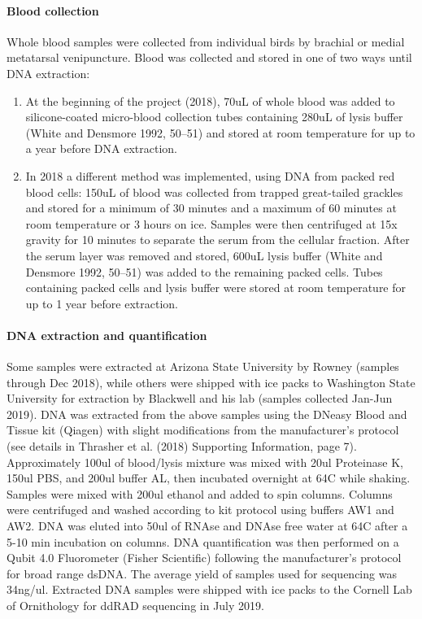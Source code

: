 \documentclass[]{article}
\let\oldparagraph\paragraph
\renewcommand{\paragraph}[1]{\oldparagraph{#1}\mbox{}}
\begin{document}
\hypertarget{blood-collection}{%
\paragraph{Blood collection}\label{blood-collection}}

Whole blood samples were collected from individual birds by brachial or
medial metatarsal venipuncture. Blood was collected and stored in one of
two ways until DNA extraction:

\begin{enumerate}
\def\labelenumi{\arabic{enumi})}
\item
  At the beginning of the project (2018), 70uL of whole blood was added
  to silicone-coated micro-blood collection tubes containing 280uL of
  lysis buffer (White and Densmore 1992, 50--51) and stored at room
  temperature for up to a year before DNA extraction.
\item
  In 2018 a different method was implemented, using DNA from packed red
  blood cells: 150uL of blood was collected from trapped great-tailed
  grackles and stored for a minimum of 30 minutes and a maximum of 60
  minutes at room temperature or 3 hours on ice. Samples were then
  centrifuged at 15x gravity for 10 minutes to separate the serum from
  the cellular fraction. After the serum layer was removed and stored,
  600uL lysis buffer (White and Densmore 1992, 50--51) was added to the
  remaining packed cells. Tubes containing packed cells and lysis buffer
  were stored at room temperature for up to 1 year before extraction.
\end{enumerate}

\hypertarget{dna-extraction-and-quantification}{%
\paragraph{DNA extraction and
quantification}\label{dna-extraction-and-quantification}}

Some samples were extracted at Arizona State University by Rowney
(samples through Dec 2018), while others were shipped with ice packs to
Washington State University for extraction by Blackwell and his lab
(samples collected Jan-Jun 2019). DNA was extracted from the above
samples using the DNeasy Blood and Tissue kit (Qiagen) with slight
modifications from the manufacturer's protocol (see details in Thrasher
et al. (2018) Supporting Information, page 7). Approximately 100ul of
blood/lysis mixture was mixed with 20ul Proteinase K, 150ul PBS, and
200ul buffer AL, then incubated overnight at 64C while shaking. Samples
were mixed with 200ul ethanol and added to spin columns. Columns were
centrifuged and washed according to kit protocol using buffers AW1 and
AW2. DNA was eluted into 50ul of RNAse and DNAse free water at 64C after
a 5-10 min incubation on columns. DNA quantification was then performed
on a Qubit 4.0 Fluorometer (Fisher Scientific) following the
manufacturer's protocol for broad range dsDNA. The average yield of
samples used for sequencing was 34ng/ul. Extracted DNA samples were
shipped with ice packs to the Cornell Lab of Ornithology for ddRAD
sequencing in July 2019.
\end{document}
